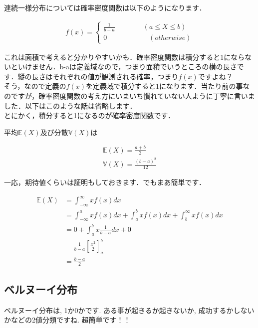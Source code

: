 \documentclass[11pt,a4paper]{ujreport} 	%
\begin{document}
連続一様分布については確率密度関数は以下のようになります．

\begin{align}
f(x) = 
\left\{
    \begin{array}{l}
      \frac{1}{b-a} \qquad \qquad  (a \leq X \leq b) \\
      0  \qquad \qquad \qquad(otherwise)
    \end{array}
  \right.
\end{align}

これは面積で考えると分かりやすいかも．確率密度関数は積分すると1にならないといけません．b-aは定義域なので，つまり面積でいうところの横の長さです．縦の長さはそれぞれの値が観測される確率，つまり$f(x)$ですよね？\\

そう，なので定義の$f(x)$を定義域で積分すると1になります．当たり前の事なのですが，確率密度関数の考え方にいまいち慣れていない人ように丁寧に言いました．以下はこのような話は省略します．\\

とにかく，積分すると1になるのが確率密度関数です．


平均$\mathbb{E}(X)$及び分散$\mathbb{V}(X)$は

\begin{align}
\mathbb{E}(X) = \frac{a+b}{2}\\
\mathbb{V}(X) = \frac{(b-a)^2}{12}
\end{align}

一応，期待値くらいは証明もしておきます．でもまあ簡単です．

\begin{align}
\mathbb{E}(X)  &= \int_{-\infty}^{\infty} xf(x) dx \\
&= \int_{-\infty}^{a} xf(x) dx + \int_{a}^{b} xf(x) dx + \int_{b}^{\infty} xf(x) dx \\
&= 0 + \int_{a}^{b} x\frac{1}{b-a} dx + 0\\
&= \frac{1}{b-a}\left[\frac{x^2}{2}\right]_a^b\\
& = \frac{b-a}{2}
\end{align}

\subsection{ベルヌーイ分布}
ベルヌーイ分布は, 1か0かです. ある事が起きるか起きないか, 成功するかしないかなどの2値分類ですね. 超簡単です！！\\
\end{document}
